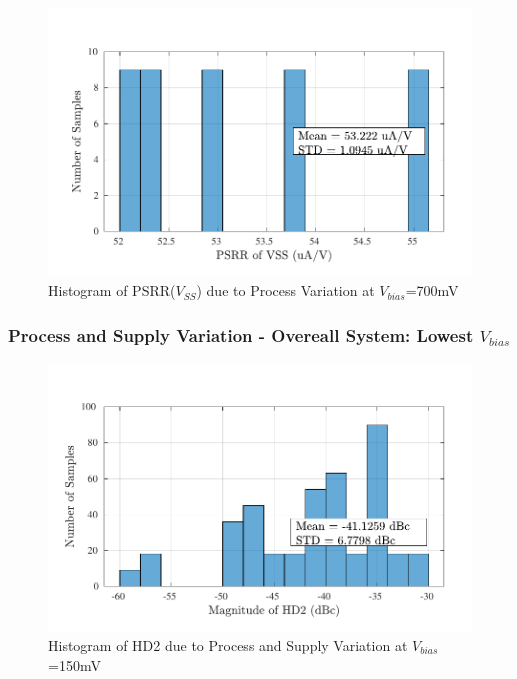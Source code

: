 \begin{figure} [H]
\centering
\includegraphics[scale=1]{Figures/Corners/Overall/Proc_Max/PDFs/Proc_Max_psrrn.pdf}
\caption{Histogram of PSRR($V_{SS}$) due to Process Variation at $V_{bias}$=700mV}
\end{figure}


\subsubsection{Process and Supply Variation - Overeall System: Lowest $V_{bias}$}
\begin{figure} [H]
\centering
\includegraphics[scale=1]{Figures/Corners/Overall/PV_Min/PDFs/PV_Min_hd2.pdf}
\caption{Histogram of HD2 due to Process and Supply Variation at $V_{bias}$=150mV}
\end{figure}

